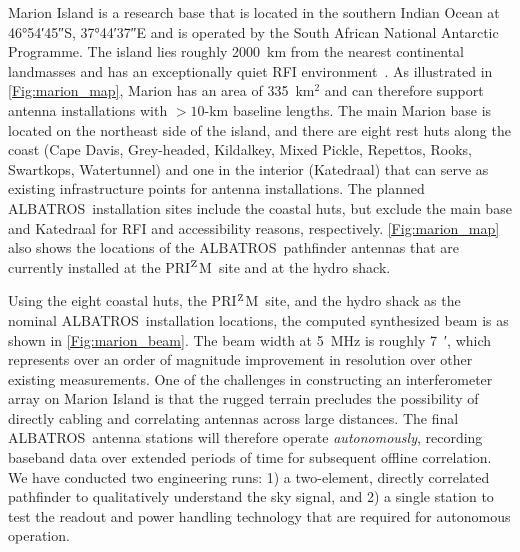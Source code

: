 \documentclass{ws-jai}
\def\albatros{ALBATROS}
\def\prizm{PRI$^{\rm Z}$M}
\begin{document}
Marion Island is a research base that is located in the southern
Indian Ocean at \ang{46;54;45}S, \ang{37;44;37}E and is operated by
the South African National Antarctic Programme.  The island lies
roughly \SI{2000}{\kilo\metre} from the nearest continental landmasses
and has an exceptionally quiet RFI
environment~\citep{2019JAI.....850004P}.  As illustrated in
\autoref{Fig:marion_map}, Marion has an area of 335~km$^2$ and can
therefore support antenna installations with $>10$-km baseline
lengths.  The main Marion base is located on the northeast side of the
island, and there are eight rest huts along the coast (Cape Davis,
Grey-headed, Kildalkey, Mixed Pickle, Repettos, Rooks, Swartkops,
Watertunnel) and one in the interior (Katedraal) that can serve as
existing infrastructure points for antenna installations.  The planned
\albatros\ installation sites include the coastal huts, but exclude
the main base and Katedraal for RFI and accessibility reasons,
respectively.  \autoref{Fig:marion_map} also shows the locations of
the \albatros\ pathfinder antennas that are currently installed at the
\prizm\ site and at the hydro shack.

Using the eight coastal huts, the \prizm\ site, and the hydro shack as
the nominal \albatros\ installation locations, the computed
synthesized beam is as shown in \autoref{Fig:marion_beam}.  The beam
width at 5~MHz is roughly \SI{7}{\arcminute}, which represents over an
order of magnitude improvement in resolution over other existing
measurements.  One of the challenges in constructing an interferometer
array on Marion Island is that the rugged terrain precludes the
possibility of directly cabling and correlating antennas across large
distances.  The final \albatros\ antenna stations will therefore
operate {\it autonomously}, recording baseband data over extended
periods of time for subsequent offline correlation.  We have conducted
two engineering runs: 1) a two-element, directly correlated pathfinder
to qualitatively understand the sky signal, and 2) a single station to
test the readout and power handling technology that are required for
autonomous operation.

\end{document}
